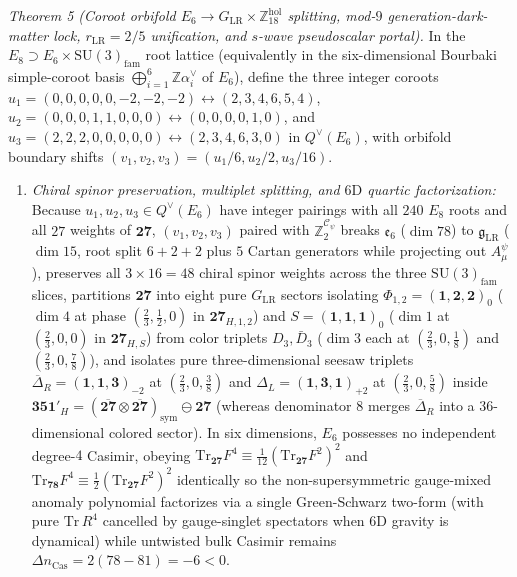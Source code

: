 \documentclass[aps,prd,twocolumn,nofootinbib,floatfix]{revtex4-2}
\begin{document}
\emph{Theorem 5 (Coroot orbifold $E_6 \to G_{\mathrm{LR}} \times \mathbb{Z}_{18}^{\mathrm{hol}}$ splitting, mod-$9$ generation-dark-matter lock, $r_{\mathrm{LR}} = 2/5$ unification, and $s$-wave pseudoscalar portal).}
In the $E_8 \supset E_6 \times \mathrm{SU}(3)_{\mathrm{fam}}$ root lattice (equivalently in the six-dimensional Bourbaki simple-coroot basis $\bigoplus_{i=1}^6\mathbb{Z}\alpha_i^\vee$ of $E_6$), define the three integer coroots $u_1 = (0,0,0,0,0,-2,-2,-2) \leftrightarrow (2,3,4,6,5,4)$, $u_2 = (0,0,0,1,1,0,0,0) \leftrightarrow (0,0,0,0,1,0)$, and $u_3 = (2,2,2,0,0,0,0,0) \leftrightarrow (2,3,4,6,3,0)$ in $Q^\vee(E_6)$, with orbifold boundary shifts $(v_1, v_2, v_3) = (u_1/6, u_2/2, u_3/16)$.
\begin{enumerate}
    \item \emph{Chiral spinor preservation, multiplet splitting, and $6\mathrm{D}$ quartic factorization:} Because $u_1, u_2, u_3 \in Q^\vee(E_6)$ have integer pairings with all $240$ $E_8$ roots and all $27$ weights of $\mathbf{27}$, $(v_1, v_2, v_3)$ paired with $\mathbb{Z}_2^{\mathcal{C}_\psi}$ breaks $\mathfrak{e}_6$ ($\dim 78$) to $\mathfrak{g}_{\mathrm{LR}}$ ($\dim 15$, root split $6 + 2 + 2$ plus $5$ Cartan generators while projecting out $A_\mu^\psi$), preserves all $3 \times 16 = 48$ chiral spinor weights across the three $\mathrm{SU}(3)_{\mathrm{fam}}$ slices, partitions $\mathbf{27}$ into eight pure $G_{\mathrm{LR}}$ sectors isolating $\Phi_{1,2} = (\mathbf{1},\mathbf{2},\mathbf{2})_0$ ($\dim 4$ at phase $(\frac{2}{3},\frac{1}{2},0)$ in $\mathbf{27}_{H,1,2}$) and $S = (\mathbf{1},\mathbf{1},\mathbf{1})_0$ ($\dim 1$ at $(\frac{2}{3},0,0)$ in $\mathbf{27}_{H,S}$) from color triplets $D_3, \bar{D}_3$ ($\dim 3$ each at $(\frac{2}{3},0,\frac{1}{8})$ and $(\frac{2}{3},0,\frac{7}{8})$), and isolates pure three-dimensional seesaw triplets $\overline{\Delta}_R = (\mathbf{1},\mathbf{1},\mathbf{3})_{-2}$ at $(\frac{2}{3},0,\frac{3}{8})$ and $\Delta_L = (\mathbf{1},\mathbf{3},\mathbf{1})_{+2}$ at $(\frac{2}{3},0,\frac{5}{8})$ inside $\mathbf{351}'_H = (\overline{\mathbf{27}}\otimes\overline{\mathbf{27}})_{\mathrm{sym}}\ominus\mathbf{27}$ (whereas denominator $8$ merges $\overline{\Delta}_R$ into a $36$-dimensional colored sector). In six dimensions, $E_6$ possesses no independent degree-$4$ Casimir, obeying $\mathrm{Tr}_{\mathbf{27}} F^4 \equiv \frac{1}{12}(\mathrm{Tr}_{\mathbf{27}} F^2)^2$ and $\mathrm{Tr}_{\mathbf{78}} F^4 \equiv \frac{1}{2}(\mathrm{Tr}_{\mathbf{27}} F^2)^2$ identically so the non-supersymmetric gauge-mixed anomaly polynomial factorizes via a single Green-Schwarz two-form (with pure $\mathrm{Tr}\,R^4$ cancelled by gauge-singlet spectators when $6\mathrm{D}$ gravity is dynamical) while untwisted bulk Casimir remains $\Delta n_{\mathrm{Cas}} = 2(78 - 81) = -6 < 0$.

\end{enumerate}
\end{document}
